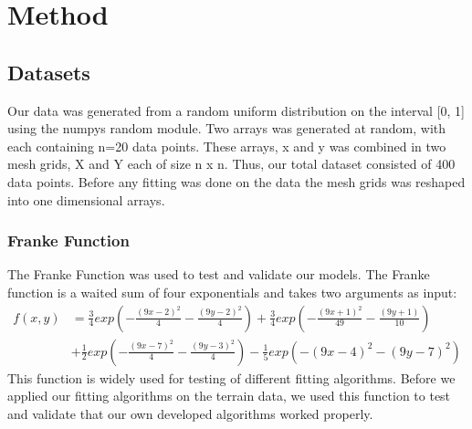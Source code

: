 \section{Method}




\subsection{Datasets}
Our data was generated from a random uniform distribution on the interval [0,
1] using the numpys random module. Two arrays was generated at random, with each containing n=20 data points. 
These arrays, x and y was combined in two mesh grids, X and Y each of size n x n. Thus, our
total dataset consisted of 400 data points. Before any fitting was done on the
data the mesh grids was reshaped into one dimensional arrays.  

\subsubsection{Franke Function}

The Franke Function was used to test and validate our models.
The Franke function is a waited sum of four exponentials and takes two
arguments as input: 
\begin{align*}
    \label{eq:franke_function} 
    f(x,y) &= \frac{3}{4}exp\left(-\frac{(9x-2)^2}{4}-\frac{(9y-2)^2}{4} \right)
    + \frac{3}{4}exp\left(-\frac{(9x+1)^2}{49}-\frac{(9y+1)}{10} \right) \\
           &+ \frac{1}{2}exp\left(-\frac{(9x-7)^2}{4}-\frac{(9y-3)^2}{4}
           \right)-\frac{1}{5}exp(-(9x-4)^2-(9y-7)^2)
\end{align*}
This function is widely used for testing of different fitting algorithms. 
Before we applied our fitting algorithms on the terrain data, we used this function
to test and validate that our own developed algorithms worked properly.    

